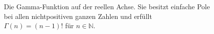 \begin{figure}
%			
%			
%			
%			
	\caption{Die Gamma-Funktion auf der reellen Achse. Sie besitzt einfache Pole bei allen nichtpositiven ganzen Zahlen und erfüllt \(\Gamma(n)=(n-1)!\) für \(n\in\mathbb{N}\).}
	\label{hankel:fig:gamma-reell}
\end{figure}
